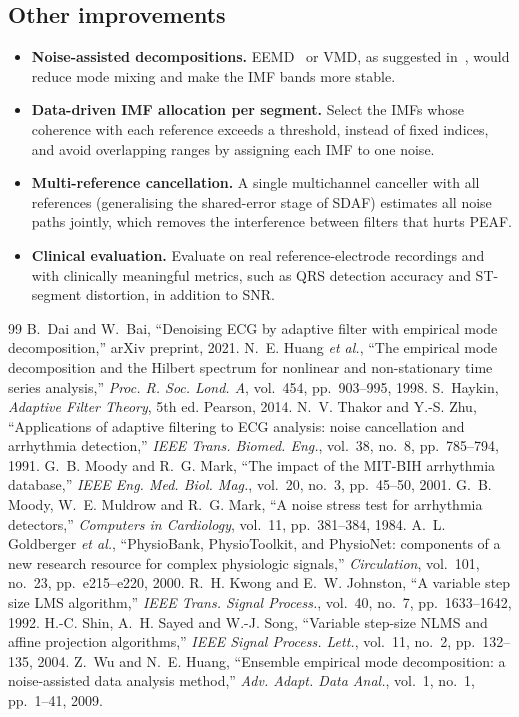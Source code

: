 \documentclass[11pt,a4paper]{article}
\begin{document}
\subsection{Other improvements}
\begin{itemize}
  \item \textbf{Noise-assisted decompositions.} EEMD~\cite{wu_eemd} or VMD, as suggested in~\cite{dai}, would
        reduce mode mixing and make the IMF bands more stable.
  \item \textbf{Data-driven IMF allocation per segment.} Select the IMFs whose coherence with each reference exceeds a
        threshold, instead of fixed indices, and avoid overlapping ranges by assigning each IMF to one noise.
  \item \textbf{Multi-reference cancellation.} A single multichannel canceller with all references (generalising the
        shared-error stage of SDAF) estimates all noise paths jointly, which removes the interference between filters
        that hurts PEAF.
  \item \textbf{Clinical evaluation.} Evaluate on real reference-electrode recordings and with clinically meaningful
        metrics, such as QRS detection accuracy and ST-segment distortion, in addition to SNR.
\end{itemize}

\begin{thebibliography}{99}\footnotesize
\setlength{\itemsep}{1pt}
 B.~Dai and W.~Bai, ``Denoising ECG by adaptive filter with empirical mode decomposition,'' arXiv
  preprint, 2021.
 N.~E. Huang \emph{et al.}, ``The empirical mode decomposition and the Hilbert spectrum for nonlinear
  and non-stationary time series analysis,'' \emph{Proc. R. Soc. Lond. A}, vol.~454, pp.~903--995, 1998.
 S.~Haykin, \emph{Adaptive Filter Theory}, 5th ed. Pearson, 2014.
 N.~V. Thakor and Y.-S. Zhu, ``Applications of adaptive filtering to ECG analysis: noise cancellation
  and arrhythmia detection,'' \emph{IEEE Trans. Biomed. Eng.}, vol.~38, no.~8, pp.~785--794, 1991.
 G.~B. Moody and R.~G. Mark, ``The impact of the MIT-BIH arrhythmia database,'' \emph{IEEE Eng.
  Med. Biol. Mag.}, vol.~20, no.~3, pp.~45--50, 2001.
 G.~B. Moody, W.~E. Muldrow and R.~G. Mark, ``A noise stress test for arrhythmia detectors,''
  \emph{Computers in Cardiology}, vol.~11, pp.~381--384, 1984.
 A.~L. Goldberger \emph{et al.}, ``PhysioBank, PhysioToolkit, and PhysioNet: components of a new
  research resource for complex physiologic signals,'' \emph{Circulation}, vol.~101, no.~23, pp.~e215--e220, 2000.
 R.~H. Kwong and E.~W. Johnston, ``A variable step size LMS algorithm,'' \emph{IEEE Trans. Signal
  Process.}, vol.~40, no.~7, pp.~1633--1642, 1992.
 H.-C. Shin, A.~H. Sayed and W.-J. Song, ``Variable step-size NLMS and affine projection algorithms,''
  \emph{IEEE Signal Process. Lett.}, vol.~11, no.~2, pp.~132--135, 2004.
 Z.~Wu and N.~E. Huang, ``Ensemble empirical mode decomposition: a noise-assisted data analysis
  method,'' \emph{Adv. Adapt. Data Anal.}, vol.~1, no.~1, pp.~1--41, 2009.
\end{thebibliography}
\end{document}

